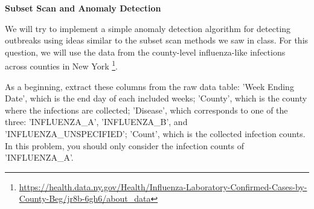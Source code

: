 \documentclass[addpoints,11pt,a4paper]{exam}
\begin{document}
\begin{questions}
\begin{parts}
    \end{parts}

    {\large \bf \question[30] Subset Scan and Anomaly Detection}

    We will try to implement a simple anomaly detection algorithm for detecting outbreaks using ideas similar to the subset scan methods we saw in class. For this question, we will use the data from the county-level influenza-like infections across counties in New York \footnote{\url{https://health.data.ny.gov/Health/Influenza-Laboratory-Confirmed-Cases-by-County-Beg/jr8b-6gh6/about_data}}.

    As a beginning, extract these columns from the raw data table: 'Week Ending Date', which is the end day of each included weeks; 'County', which is the county where the infections are collected; 'Disease', which corresponds to one of the three: 'INFLUENZA\_A', 'INFLUENZA\_B', and 'INFLUENZA\_UNSPECIFIED'; 'Count', which is the collected infection counts. In this problem, you should only consider the infection counts of 'INFLUENZA\_A'.


\end{questions}
\end{document}
